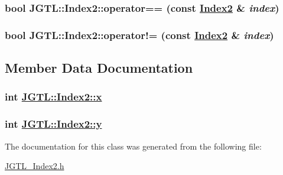 \hypertarget{class_j_g_t_l_1_1_index2_68ce5b51f0249e1ec5c9c06481ba8423}{
\subsubsection[operator==]{\setlength{\rightskip}{0pt plus 5cm}bool JGTL::Index2::operator== (const \hyperlink{class_j_g_t_l_1_1_index2}{Index2} \& {\em index})}}
\label{class_j_g_t_l_1_1_index2_68ce5b51f0249e1ec5c9c06481ba8423}


\hypertarget{class_j_g_t_l_1_1_index2_e97a27cfa0c26e2dda554109f5770799}{
\subsubsection[operator"!=]{\setlength{\rightskip}{0pt plus 5cm}bool JGTL::Index2::operator!= (const \hyperlink{class_j_g_t_l_1_1_index2}{Index2} \& {\em index})}}
\label{class_j_g_t_l_1_1_index2_e97a27cfa0c26e2dda554109f5770799}




\subsection{Member Data Documentation}
\hypertarget{class_j_g_t_l_1_1_index2_2890321cfbdc826c6e33f15e6a0a0f2f}{
\subsubsection[x]{\setlength{\rightskip}{0pt plus 5cm}int \hyperlink{class_j_g_t_l_1_1_index2_2890321cfbdc826c6e33f15e6a0a0f2f}{JGTL::Index2::x}}}
\label{class_j_g_t_l_1_1_index2_2890321cfbdc826c6e33f15e6a0a0f2f}


\hypertarget{class_j_g_t_l_1_1_index2_921a51f4736b4239217532c60a81fa31}{
\subsubsection[y]{\setlength{\rightskip}{0pt plus 5cm}int \hyperlink{class_j_g_t_l_1_1_index2_921a51f4736b4239217532c60a81fa31}{JGTL::Index2::y}}}
\label{class_j_g_t_l_1_1_index2_921a51f4736b4239217532c60a81fa31}




The documentation for this class was generated from the following file:\begin{CompactItemize}
\item 
\hyperlink{_j_g_t_l___index2_8h}{JGTL\_\-Index2.h}\end{CompactItemize}
